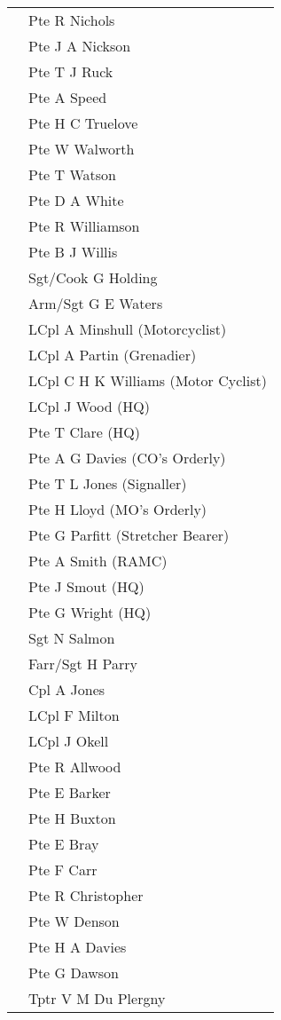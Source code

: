 \begin{center}
\begin{tabular}{rl}
    & Pte R Nichols \\
    & Pte J A Nickson \\
    & Pte T J Ruck \\
    & Pte A Speed \\
    & Pte H C Truelove \\
    & Pte W Walworth \\
    & Pte T Watson \\
    & Pte D A White \\
    & Pte R Williamson \\
    & Pte B J Willis \\
    & Sgt/Cook G Holding \\
    & Arm/Sgt G E Waters \\
    & LCpl A Minshull (Motorcyclist) \\
    & LCpl A Partin (Grenadier) \\
    & LCpl C H K Williams (Motor Cyclist) \\
    & LCpl J Wood (HQ) \\
    & Pte T Clare (HQ) \\
    & Pte A G Davies (CO's Orderly) \\
    & Pte T L Jones (Signaller) \\
    & Pte H Lloyd (MO's Orderly) \\
    & Pte G Parfitt (Stretcher Bearer) \\
    & Pte A Smith (RAMC) \\
    & Pte J Smout (HQ) \\
    & Pte G Wright (HQ) \\
    & Sgt N Salmon \\
    & Farr/Sgt H Parry \\
    & Cpl A Jones \\
    & LCpl F Milton \\
    & LCpl J Okell \\
    & Pte R Allwood \\
    & Pte E Barker \\
    & Pte H Buxton \\
    & Pte E Bray \\
    & Pte F Carr \\
    & Pte R Christopher \\
    & Pte W Denson \\
    & Pte H A Davies \\
    & Pte G Dawson \\
    & Tptr V M Du Plergny \\

\end{tabular}
\end{center}
